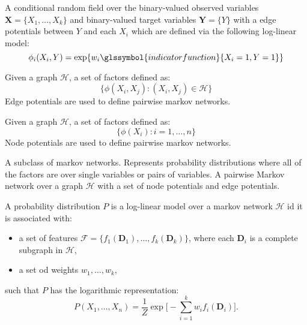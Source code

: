 {%
  A \gls{conditional random field} over the binary-valued \glspl{observed variable} $\bm{X}=\{X_1,\dots,X_k\}$ and binary-valued \glspl{target variable} $\bm{Y}=\{Y\}$ with a \glspl{edge potential} between $Y$ and each $X_i$ which are defined via the following \gls{log-linear model}:
  \begin{equation*}
    \phi_i(X_i,Y)=\exp\{ w_i \glssymbol{indicator function} \{ X_i=1,Y=1\}\}
  \end{equation*}
}

{%
  Given a \gls{graph} $\mathcal{H}$, a set of \glspl{factor} defined as:
  \begin{equation*}
    \{\phi(X_i,X_j):(X_i,X_j)\in\mathcal{H}\}
  \end{equation*}
  Edge potentials are used to define \glspl{pairwise markov network}.

}

{%
  Given a \gls{graph} $\mathcal{H}$, a set of \glspl{factor} defined as:
  \begin{equation*}
    \{\phi(X_i):i=1,\dots,n\}
  \end{equation*}
  Node potentials are used to define \glspl{pairwise markov network}.
}

{%
  A subclass of \glspl{markov network}. Represents \glspl{probability distribution} where all of the \glspl{factor} are over single variables or pairs of variables. A pairwise Markov network over a graph $\mathcal{H}$ with a set of \glspl{node potential} and \glspl{edge potential}.
}

{%
  A \gls{probability distribution} $P$ is a log-linear model over a \gls{markov network} $\mathcal{H}$ id it is associated with:
  \begin{itemize}
    \item a set of \glspl{feature} $\mathcal{F}=\{f_1(\bm{D}_1),\dots,f_k(\bm{D}_k)\}$, where each $\bm{D}_i$ is a \gls{complete subgraph} in $\mathcal{H}$,
    \item a set od weights $w_1,\dots,w_k$,
  \end{itemize}
  such that $P$ has the \gls{logarithmic representation}:
  \begin{equation*}
    P(X_1,\dots,X_n)=\frac{1}{Z}\exp \Bigg[ -\sum_{i=1}^k w_i f_i(\bm{D}_i) \Bigg] .
  \end{equation*}
}

